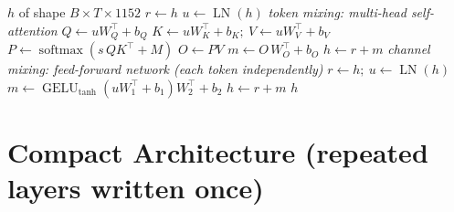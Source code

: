 \documentclass[10pt,a4paper]{article}
\newcommand{\op}[1]{\operatorname{#1}}
\theoremstyle{definition}
\begin{document}
\begin{algorithm}[H]
\caption{Block $\mathcal{B}_{\mathrm{V}}(h)$ --- Vision encoder block}
\begin{algorithmic}[1]
\Require $h$ of shape $B\times T\times 1152$
\State $r \gets h$ 
\State $u \gets \op{LN}(h)$ 
\Statex \hspace{-1.2em}\textit{token mixing: multi-head self-attention}
\State $Q \gets u W_Q^{\top} + b_Q$ 
\State $K \gets u W_K^{\top} + b_K;\ V \gets u W_V^{\top} + b_V$ 
\State $P \gets \op{softmax}(s\, Q K^{\top} + M)$ 
\State $O \gets P V$ 
\State $m \gets O\, W_O^{\top} + b_O$ 
\State $h \gets r + m$ 
\Statex \hspace{-1.2em}\textit{channel mixing: feed-forward network (each token independently)}
\State $r \gets h;\ u \gets \op{LN}(h)$
\State $m \gets \op{GELU}_{\tanh}(u W_1^{\top} + b_1) W_2^{\top} + b_2$ 
\State $h \gets r + m$ 
\State \Return $h$
\end{algorithmic}
\end{algorithm}
\section{Compact Architecture (repeated layers written once)}\label{sec:compact}
\end{document}
